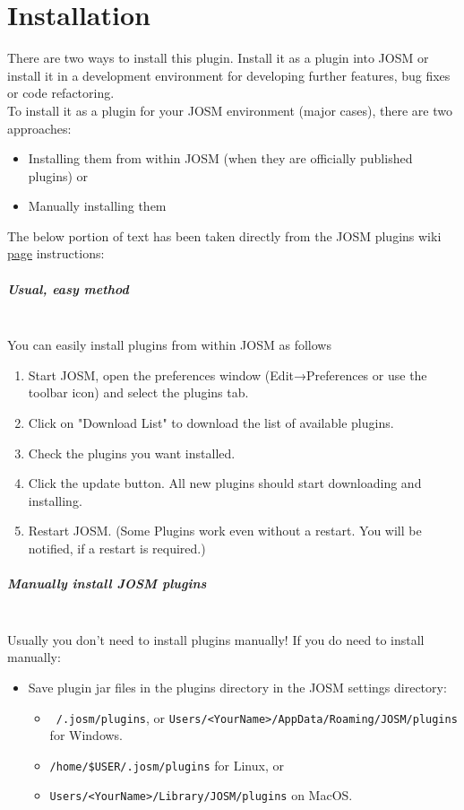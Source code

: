 \chapter{Installation}
There are two ways to install this plugin. Install it as a plugin into JOSM or install it in a development environment for developing further features, bug fixes or code refactoring.\\
\newline
To install it as a plugin for your JOSM environment (major cases), there are two approaches:
\begin{itemize}
	\item Installing them from within JOSM (when they are officially published plugins) or
	\item Manually installing them
\end{itemize}

The below portion of text has been taken directly from the JOSM plugins wiki \href{https://wiki.openstreetmap.org/wiki/JOSM/Plugins#Installation}{page} instructions: \cite{JOSMPlugins}\
\paragraph{Usual, easy method}\mbox{}\\
You can easily install plugins from within JOSM as follows
\begin{enumerate}
	\item Start JOSM, open the preferences window (Edit→Preferences or use the toolbar icon) and select the plugins tab.
	\item Click on "Download List" to download the list of available plugins.
	\item Check the plugins you want installed.
	\item Click the update button. All new plugins should start downloading and installing.
	\item Restart JOSM. (Some Plugins work even without a restart. You will be notified, if a restart is required.)
\end{enumerate}
\paragraph{Manually install JOSM plugins}\mbox{}\\
\label{par:ManuallyInstall}
Usually you don't need to install plugins manually! If you do need to install manually:

\begin{itemize}
	\item{Save plugin jar files in the plugins directory in the JOSM settings directory:
		\begin{itemize}
			\item \texttt{~/.josm/plugins}, or \texttt{Users/<YourName>/AppData/Roaming/JOSM/plugins} for Windows.
			\item \texttt{/home/\$USER/.josm/plugins} for Linux, or
			\item \texttt{Users/<YourName>/Library/JOSM/plugins} on MacOS.
		\end{itemize}  }
\end{itemize}
